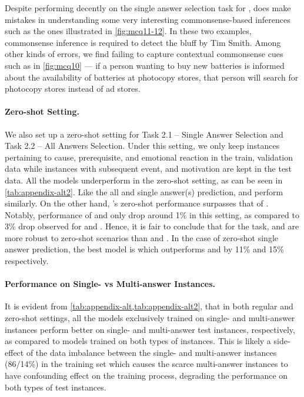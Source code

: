 Despite performing decently on the single answer selection task for \dataset{},  does make mistakes in understanding some very interesting commonsense-based inferences such as the ones illustrated in \cref{fig:mcq11-12}. In these two examples, commonsense inference is required to detect the bluff by Tim Smith. Among other kinds of errors, we find  failing to capture contextual commonsense cues such as in \cref{fig:mcq10} --- if a person wanting to buy new batteries is informed about the availability of batteries at photocopy stores, that person will search for photocopy stores instead of ad stores. 

\paragraph{Zero-shot Setting.} We also set up a zero-shot setting for Task 2.1 -- Single Answer Selection and Task 2.2 -- All Answers Selection. Under this setting, we only keep instances pertaining to cause, prerequisite, and emotional reaction in the train, validation data while instances with subsequent event, and motivation are kept in the test data. All the models underperform in the zero-shot setting, as can be seen in \cref{tab:appendix-alt2}. Like the all and single answer(s) prediction,  and  perform similarly. On the other hand, 's zero-shot performance surpasses that of . Notably, performance of  and  only drop around 1\% in this setting, as compared to 3\% drop observed for  and . Hence, it is fair to conclude that for the \dataset{} task,  and  are more robust to zero-shot scenarios than  and . In the case of zero-shot single answer prediction, the best model is  which outperforms  and  by 11\% and 15\% respectively. 

\paragraph{Performance on Single- vs Multi-answer Instances.} It is evident from \cref{tab:appendix-alt,tab:appendix-alt2}, that in both regular and zero-shot settings, all the models exclusively trained on single- and multi-answer instances perform better on single- and multi-answer test instances, respectively, as compared to models trained on both types of instances. This is likely a side-effect of the data imbalance between the single- and multi-answer instances (86/14\%) in the training set which causes the scarce multi-answer instances to have confounding effect on the training process, degrading the performance on both types of test instances.


